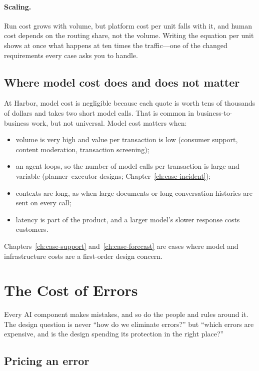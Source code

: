 \paragraph{Scaling.} Run cost grows with volume, but platform cost per unit falls with it, and human cost depends on the routing share, not the volume. Writing the equation per unit shows at once what happens at ten times the traffic---one of the changed requirements every case asks you to handle.

\subsection{Where model cost does and does not matter}

At Harbor, model cost is negligible because each quote is worth tens of thousands of dollars and takes two short model calls. That is common in business-to-business work, but not universal. Model cost matters when:
\begin{itemize}[itemsep=1pt]
  \item volume is very high and value per transaction is low (consumer support, content moderation, transaction screening);
  \item an agent loops, so the number of model calls per transaction is large and variable (planner--executor designs; Chapter~\ref{ch:case-incident});
  \item contexts are long, as when large documents or long conversation histories are sent on every call;
  \item latency is part of the product, and a larger model's slower response costs customers.
\end{itemize}
Chapters~\ref{ch:case-support} and~\ref{ch:case-forecast} are cases where model and infrastructure costs are a first-order design concern.

\section{The Cost of Errors}
\label{sec:error-cost}

Every AI component makes mistakes, and so do the people and rules around it. The design question is never ``how do we eliminate errors?'' but ``which errors are expensive, and is the design spending its protection in the right place?''

\subsection{Pricing an error}

